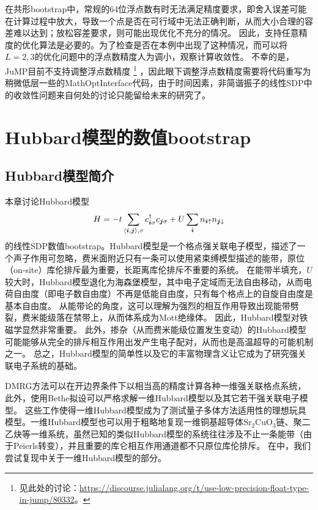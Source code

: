 \documentclass[oneside]{fduthesis}
\begin{document}
在共形bootstrap中，常规的64位浮点数有时无法满足精度要求，即舍入误差可能在计算过程中放大，导致一个点是否在可行域中无法正确判断，从而大小合理的容差难以达到；放松容差要求，则可能出现优化不充分的情况。
因此，支持任意精度的优化算法是必要的\cite{conformal-sdp}。为了检查是否在本例中出现了这种情况，而可以将$L=2, 3$的优化问题中的浮点数精度人为调小，观察计算收敛性。
不幸的是，JuMP目前不支持调整浮点数精度%
\footnote{见此处的讨论：\url{https://discourse.julialang.org/t/use-low-precision-float-type-in-jump/80332}。}%
，因此眼下调整浮点数精度需要将代码重写为稍微低层一些的MathOptInterface\cite{legat2021mathoptinterface}代码，由于时间因素，非简谐振子的线性SDP中的收敛性问题来自何处的讨论只能留给未来的研究了。

\chapter{Hubbard模型的数值bootstrap}\label{chap:hubbard}

\section{Hubbard模型简介}

本章讨论Hubbard模型
\begin{equation}
    H = - t \sum_{\langle \vb*{i}, \vb*{j} \rangle, \sigma} c^\dagger_{\vb*{i} \sigma} c_{\vb*{j} \sigma} + U \sum_{\vb*{i}} n_{\vb*{i} \uparrow} n_{\vb*{j} \downarrow}
\end{equation}
的线性SDP数值bootstrap。Hubbard模型是一个格点强关联电子模型，描述了一个声子作用可忽略，费米面附近只有一条可以使用紧束缚模型描述的能带，原位（on-site）库伦排斥最为重要，长距离库伦排斥不重要的系统。
在能带半填充，$U$较大时，Hubbard模型退化为海森堡模型，其中电子定域而无法自由移动，从而电荷自由度（即电子数自由度）不再是低能自由度，只有每个格点上的自旋自由度是基本自由度。
从能带论的角度，这可以理解为强烈的相互作用导致出现能带劈裂，费米能级落在禁带上，从而体系成为Mott绝缘体。
因此，Hubbard模型对铁磁学显然非常重要。
此外，掺杂（从而费米能级位置发生变动）的Hubbard模型可能能够从完全的排斥相互作用出发产生电子配对，从而也是高温超导的可能机制之一。
总之，Hubbard模型的简单性以及它的丰富物理含义让它成为了研究强关联电子系统的基础\cite{fradkin2013field}。

DMRG方法可以在开边界条件下以相当高的精度计算各种一维强关联格点系统\cite{Schollw_ck_2011}，
此外，使用Bethe拟设可以严格求解一维Hubbard模型以及其它若干强关联电子模型\cite{PhysRevLett.20.1445,korepin1994exactly}。
这些工作使得一维Hubbard模型成为了测试量子多体方法适用性的理想玩具模型。一维Hubbard模型也可以用于粗略地复现一维铜基超导体$\mathrm{Sr}_{2} \mathrm{CuO}_{3}$链、聚二乙炔等一维系统，虽然已知的类似Hubbard模型的系统往往涉及不止一条能带（由于Peierls转变），并且重要的库仑相互作用通道都不只原位库伦排斥。
在中，我们尝试复现\parencite{han_manybody}中关于一维Hubbard模型的部分。
\end{document}
